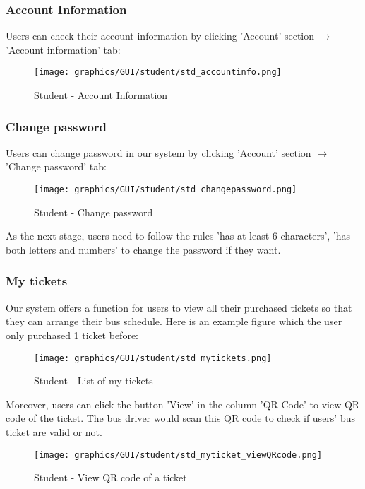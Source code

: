     

         \subsubsection{Account Information}
            \noindent Users can check their account information by clicking 'Account' section $\rightarrow$ 'Account information' tab:
                \begin{figure}[H]
                    \centering
                    \texttt{[image: graphics/GUI/student/std\_accountinfo.png]}
                    \caption{Student - Account Information}
                \label{fig:std_accountinfo}
                \end{figure}
          \subsubsection{Change password}      
            \noindent Users can change password in our system by clicking 'Account' section $\rightarrow$ 'Change password' tab:
                \begin{figure}[H]
                    \centering
                    \texttt{[image: graphics/GUI/student/std\_changepassword.png]}
                    \caption{Student - Change password}
                \label{fig:std_changepassword}
                \end{figure}
            \noindent As the next stage, users need to follow the rules 'has at least 6 characters', 'has both letters and numbers' to change the password if they want.
         \subsubsection{My tickets}   
            \noindent Our system offers a function for users to view all their purchased tickets so that they can arrange their bus schedule. Here is an example figure which the user only purchased 1 ticket before:
                \begin{figure}[H]
                    \centering
                    \texttt{[image: graphics/GUI/student/std\_mytickets.png]}
                    \caption{Student - List of my tickets}
                \label{fig:std_mytickets}
                \end{figure}
            \noindent Moreover, users can click the button 'View' in the column 'QR Code' to view QR code of the ticket. The bus driver would scan this QR code to check if users' bus ticket are valid or not.
                \begin{figure}[H]
                    \centering
                    \texttt{[image: graphics/GUI/student/std\_myticket\_viewQRcode.png]}
                    \caption{Student - View QR code of a ticket}
                \label{fig:std_mytickets_QRcode}
                \end{figure}
                
